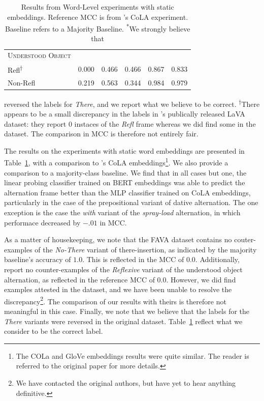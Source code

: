 \documentclass[11pt]{article}
\begin{document}
\begin{table}[!h]
\begin{tabular}{lrrrrr}
\textsc{Understood Object }&         &       &            &           &        \\
\hspace{1em} Refl\textsuperscript{$\dagger$}    &    0.000 & 0.466 &      0.466 &     0.867 &  0.833 \\
\hspace{1em} Non-Refl        &    0.219 & 0.563 &      0.344 &     0.984 &  0.979 \\
\bottomrule
\end{tabular}
\caption{Results from Word-Level experiments with static embeddings. Reference MCC is from  \protect\citet{kann-etal-2019-verb}'s CoLA experiment.  Baseline refers to a Majority Baseline.  \textsuperscript{*}We strongly believe that \protect\citeauthor{kann-etal-2019-verb}}reversed the labels for \textit{There}, and we report what we believe to be correct. \textsuperscript{$\dagger$}There appears to be a small discrepancy in the labels in \protect\citeauthor{kann-etal-2019-verb}'s publically released LaVA dataset: they report $0$ instaces of the \textit{Refl} frame whereas we did find some in the dataset.  The comparison in MCC is therefore not entirely fair.
\label{tab:static-word-results}
\end{table}

The results on the experiments with static word embeddings are presented in Table~\ref{tab:static-word-results}, with a comparison to \citet{kann-etal-2019-verb}'s CoLA embeddings\footnote{The COLa and GloVe embeddings results were quite similar.  The reader is referred to the original paper for more details.}.   We also provide a comparison to a majority-class baseline.  We find that in all cases but one, the linear probing classifier trained on  BERT embeddings was able to predict the alternation frame better than the MLP classifier trained on CoLA embeddings, particularly in the case of the prepositional variant of dative alternation.  The one exception is the case the \textit{with} variant of the \textit{spray-load} alternation, in which performace decreased by $-.01$ in MCC.

As a matter of housekeeping, we note that the FAVA dataset contains no couter-examples of the \textit{No-There} variant of there-insertion, as indicated by the majority baseline's accuracy of $1.0$.  This is reflected in the MCC of $0.0$.  Additionally, \citet{kann-etal-2019-verb} report no counter-examples of the \textit{Reflexive} variant of the understood object alternation, as reflected in the reference MCC of $0.0$.  However, we did find examples attested in the dataset, and we have been unable to resolve the discrepancy\footnote{We have contacted the original authors, but have yet to hear anything definitive.}.  The comparison of our results with theirs is therefore not meaningful in this case.  Finally, we note that we believe that the labels for the \textit{There} variants were reversed in the original dataset.   Table~\ref{tab:static-word-results} reflect what we consider to be the correct label.
\end{document}
